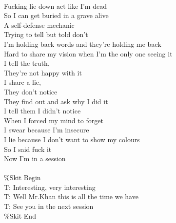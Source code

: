 \documentclass[12pt, b5paper, oneside]{book}
\begin{document}
\\Fucking lie down act like I'm dead
\\So I can get buried in a grave alive
\\A self-defense mechanic
\\Trying to tell but told don't
\\I'm holding back words and they're holding me back
\\Hard to share my vision when I'm the only one seeing it
\\I tell the truth,
\\They're not happy with it
\\I share a lie,
\\They don't notice
\\They find out and ask why I did it
\\I tell them I didn't notice
\\When I forced my mind to forget
\\I swear because I'm insecure
\\I lie because I don't want to show my colours
\\So I said fuck it
\\Now I'm in a session
\\\\\%Skit Begin
\\T: Interesting, very interesting
\\T: Well Mr.Khan this is all the time we have
\\T: See you in the next session
\\\%Skit End 

\newpage
\end{document}

